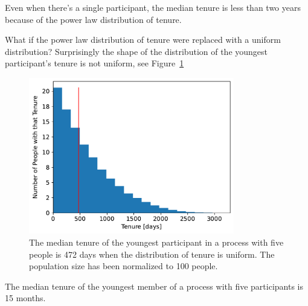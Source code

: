 Even when there's a single participant, the median tenure is less than two years because of the power law distribution of tenure.

What if the power law distribution of tenure were replaced with a uniform distribution?
Surprisingly the shape of the distribution of the youngest participant's tenure is not uniform, see Figure~\ref{fig:tenure-uniform-5-participants}

\begin{figure}[!htb]  %
    \centering
    \includegraphics[width=0.8\textwidth]{images/tenure_uniform_distribution_with_max_tenure10_and_5_participants_median472.pdf}
    \caption{The median tenure of the youngest participant
 in a process with five people is 472 days when the distribution of tenure is uniform. The population size has been normalized to 100 people.}
    \label{fig:tenure-uniform-5-participants}
\end{figure}

The median tenure of the youngest member of a process with five participants is 15 months. 

\FloatBarrier